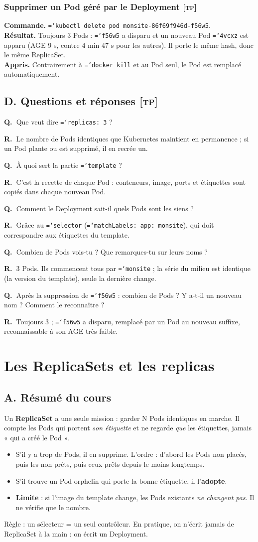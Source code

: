 \documentclass[11pt,a4paper]{article}
\newcommand{\cmd}[1]{\texttt{\hyphenchar\font=`\-#1}}
\newcommand{\tp}{\textsc{[tp]}}
\newcommand{\QR}[2]{\needspace{4\baselineskip}\par\noindent\textbf{Q.~}#1\par\nopagebreak\noindent\textbf{R.~}#2\par\medskip}
\newcommand{\partie}[1]{\needspace{9\baselineskip}\subsection*{#1}}
\newcommand{\exo}[1]{\needspace{8\baselineskip}\subsubsection*{#1}}
\begin{document}
\exo{Supprimer un Pod géré par le Deployment \tp}
\textbf{Commande.} \cmd{kubectl delete pod monsite-86f69f946d-f56w5}.\\
\textbf{Résultat.} Toujours 3 Pods : \cmd{f56w5} a disparu et un nouveau Pod \cmd{4vcxz} est apparu (AGE 9 s, contre 4 min 47 s pour les autres). Il porte le même hash, donc le même ReplicaSet.\\
\textbf{Appris.} Contrairement à \cmd{docker kill} et au Pod seul, le Pod est remplacé automatiquement.

\partie{D. Questions et réponses \tp}
\QR{Que veut dire \cmd{replicas: 3} ?}{Le nombre de Pods identiques que Kubernetes maintient en permanence ; si un Pod plante ou est supprimé, il en recrée un.}
\QR{À quoi sert la partie \cmd{template} ?}{C'est la recette de chaque Pod : conteneurs, image, ports et étiquettes sont copiés dans chaque nouveau Pod.}
\QR{Comment le Deployment sait-il quels Pods sont les siens ?}{Grâce au \cmd{selector} (\cmd{matchLabels: app: monsite}), qui doit correspondre aux étiquettes du template.}
\QR{Combien de Pods vois-tu ? Que remarques-tu sur leurs noms ?}{3 Pods. Ils commencent tous par \cmd{monsite} ; la série du milieu est identique (la version du template), seule la dernière change.}
\QR{Après la suppression de \cmd{f56w5} : combien de Pods ? Y a-t-il un nouveau nom ? Comment le reconnaître ?}{Toujours 3 ; \cmd{f56w5} a disparu, remplacé par un Pod au nouveau suffixe, reconnaissable à son AGE très faible.}

\section{Les ReplicaSets et les replicas}

\partie{A. Résumé du cours}
Un \textbf{ReplicaSet} a une seule mission : garder N Pods identiques en marche. Il compte les Pods qui portent \emph{son étiquette} et ne regarde \emph{que} les étiquettes, jamais « qui a créé le Pod ».
\begin{itemize}
  \item S'il y a trop de Pods, il en supprime. L'ordre : d'abord les Pods non placés, puis les non prêts, puis ceux prêts depuis le moins longtemps.
  \item S'il trouve un Pod orphelin qui porte la bonne étiquette, il l'\textbf{adopte}.
  \item \textbf{Limite} : si l'image du template change, les Pods existants \emph{ne changent pas}. Il ne vérifie que le nombre.
\end{itemize}
Règle : un sélecteur = un seul contrôleur. En pratique, on n'écrit jamais de ReplicaSet à la main : on écrit un Deployment.
\end{document}
